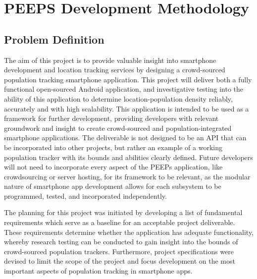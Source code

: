 \chapter{PEEPS Development Methodology}

\section{Problem Definition}
The aim of this project is to provide valuable insight into smartphone development and location tracking services by designing a crowd-sourced population tracking smartphone application. This project will deliver both a fully functional open-sourced Android application, and investigative testing into the ability of this application to determine location-population density reliably, accurately and with high scalability. This application is intended to be used as a framework for further development, providing developers with relevant groundwork and insight to create crowd-sourced and population-integrated smartphone applications. The deliverable is not designed to be an API that can be incorporated into other projects, but rather an example of a working population tracker with its bounds and abilities clearly defined. Future developers will not need to incorporate every aspect of the PEEPs application, like crowdsourcing or server hosting, for its framework to be relevant, as the modular nature of smartphone app development allows for each subsystem to be programmed, tested, and incorporated independently.

The planning for this project was initiated by developing a list of fundamental requirements which serve as a baseline for an acceptable project deliverable. These requirements determine whether the application has adequate functionality, whereby research testing can be conducted to gain insight into the bounds of crowd-sourced population trackers. Furthermore, project specifications were devised to limit the scope of the project and focus development on the most important aspects of population tracking in smartphone apps. 

